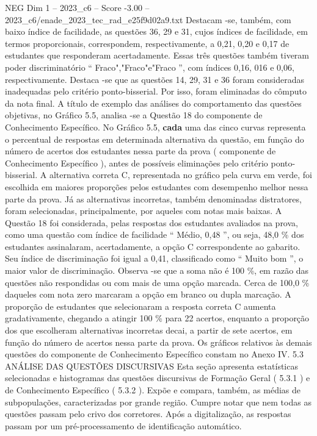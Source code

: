 \begin{textsample}{NEG Dim 1 – 2023\_c6 – Score -3.00 – 2023\_c6/enade\_2023\_tec\_rad\_e25f9d02a9.txt}
Destacam -se, também, com baixo índice de facilidade, as questões 36, 29 e 31, cujos índices de facilidade, em termos proporcionais, correspondem, respectivamente, a 0,21, 0,20 e 0,17 de estudantes que responderam acertadamente.
Essas três questões também tiveram poder discriminatório “ Fraco","Fraco"e"Fraco ”, com índices 0,16, 016 e 0,06, respectivamente.
Destaca -se que as questões 14, 29, 31 e 36 foram consideradas inadequadas pelo critério ponto-bisserial.
Por isso, foram eliminadas do cômputo da nota final.
A título de exemplo das análises do comportamento das questões objetivas, no Gráfico 5.5, analisa -se a Questão 18 do componente de Conhecimento Específico.
No Gráfico 5.5, \textbf{cada} uma das cinco curvas representa o percentual de respostas em determinada alternativa da questão, em função do número de acertos dos estudantes nessa parte da prova ( componente de Conhecimento Específico ), antes de possíveis eliminações pelo critério ponto-bisserial.
A alternativa correta C, representada no gráfico pela curva em verde, foi escolhida em maiores proporções pelos estudantes com desempenho melhor nessa parte da prova.
Já as alternativas incorretas, também denominadas distratores, foram selecionadas, principalmente, por aqueles com notas mais baixas.
A Questão 18 foi considerada, pelas respostas dos estudantes avaliados na prova, como uma questão com índice de facilidade “ Médio, 0,48 ”, ou seja, 48,0 \% dos estudantes assinalaram, acertadamente, a opção C correspondente ao gabarito.
Seu índice de discriminação foi igual a 0,41, classificado como “ Muito bom ”, o maior valor de discriminação.
Observa -se que a soma não é 100 \%, em razão das questões não respondidas ou com mais de uma opção marcada.
Cerca de 100,0 \% daqueles com nota zero marcaram a opção em branco ou dupla marcação.
A proporção de estudantes que selecionaram a resposta correta C aumenta gradativamente, chegando a atingir 100 \% para 22 acertos, enquanto a proporção dos que escolheram alternativas incorretas decai, a partir de sete acertos, em função do número de acertos nessa parte da prova.
Os gráficos relativos às demais questões do componente de Conhecimento Específico constam no Anexo IV. 5.3 ANÁLISE DAS QUESTÕES DISCURSIVAS Esta seção apresenta estatísticas selecionadas e histogramas das questões discursivas de Formação Geral ( 5.3.1 ) e de Conhecimento Específico ( 5.3.2 ).
Expõe e compara, também, as médias de subpopulações, caracterizadas por grande região.
Cumpre notar que nem todas as questões passam pelo crivo dos corretores.
Após a digitalização, as respostas passam por um pré-processamento de identificação automático.

\end{textsample}
